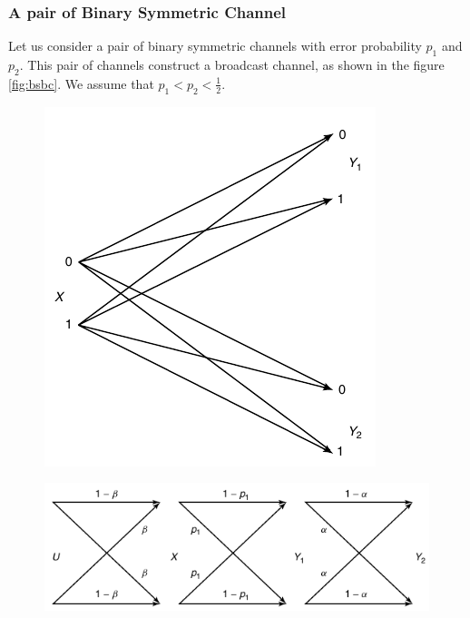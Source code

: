 \subsubsection{A pair of Binary Symmetric Channel}
Let us consider a pair of binary symmetric channels with error probability $p_1$ and $p_2$. This pair of channels construct a broadcast channel, as shown in the figure \ref{fig:bsbc}. We assume that $p_1 < p_2< \frac{1}{2}$. \\
%
\begin{figure}[h]
\centering
\begin{minipage}{.35\textwidth}
  \centering
  \includegraphics[scale=0.4]{Diagrams/BSBC.png}
  \label{fig:bsbc}
\end{minipage}%
\hspace{2 em}
\begin{minipage}{.55\textwidth}
  \centering
  \includegraphics[scale=0.5]{Diagrams/BSDBC.png}
  \label{fig:bsdbc}
\end{minipage}
\end{figure}
